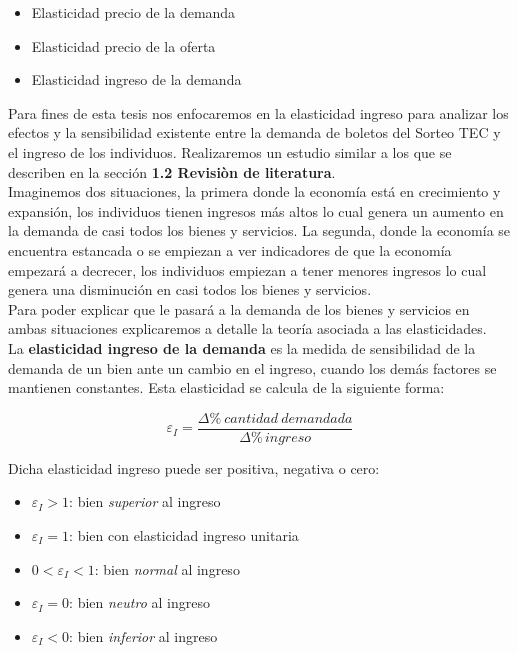 \begin{itemize}
    \item Elasticidad precio de la demanda
    \item Elasticidad precio de la oferta
    \item Elasticidad ingreso de la demanda
\end{itemize}

Para fines de esta tesis nos enfocaremos en la elasticidad ingreso para analizar los efectos y la sensibilidad existente entre la demanda de boletos del Sorteo TEC y el ingreso de los individuos. Realizaremos un estudio similar a los que se describen en la sección \textbf{1.2 Revisiòn de literatura}. \\ 

Imaginemos dos situaciones, la primera donde la economía está en crecimiento y expansión, los individuos tienen ingresos más altos lo cual genera un aumento en la demanda de casi todos los bienes y servicios. La segunda, donde la economía se encuentra estancada o se empiezan a ver indicadores de que la economía empezará a decrecer, los individuos empiezan a tener menores ingresos lo cual genera una disminución en casi todos los bienes y servicios. \\

Para poder explicar que le pasará a la demanda de los bienes y servicios en ambas situaciones explicaremos a detalle la teoría asociada a las elasticidades. \\

La \textbf{elasticidad ingreso de la demanda}  es la medida de sensibilidad de la demanda de un bien ante un cambio en el ingreso, cuando los demás factores se mantienen constantes. Esta elasticidad se calcula de la siguiente forma:

$$
\varepsilon_I= \frac{ \Delta \% \: cantidad \: demandada}{\Delta \% \, ingreso}
$$

Dicha elasticidad ingreso puede ser positiva, negativa o cero:

\begin{itemize}
    \item $\varepsilon_I > 1$: bien \textit{superior} al ingreso
    \item $\varepsilon_I = 1$: bien con elasticidad ingreso unitaria
    \item $0 < \varepsilon_I < 1$: bien \textit{normal} al ingreso
    \item $\varepsilon_I = 0$: bien \textit{neutro} al ingreso
    \item $\varepsilon_I < 0$: bien \textit{inferior} al ingreso
\end{itemize}{}

